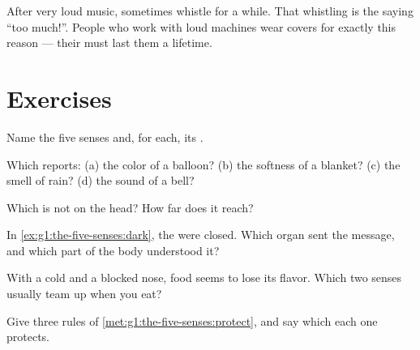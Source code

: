 \begin{example}\label{ex:g1:the-five-senses:loud}
After very loud music,  sometimes whistle for a while. That
whistling is the  saying ``too much!''. People who work with
loud machines wear  covers for exactly this reason --- their
 must last them a lifetime.
\end{example}

\section{Exercises}

\begin{exercise}[$\star$]\label{exo:g1:the-five-senses:1}
Name the five senses and, for each, its .
\end{exercise}

\begin{exercise}[$\star$]\label{exo:g1:the-five-senses:2}
Which  reports: (a) the color of a balloon? (b) the
softness of a blanket? (c) the smell of rain? (d) the sound of a
bell?
\end{exercise}

\begin{exercise}[$\star$]\label{exo:g1:the-five-senses:3}
Which  is not on the head? How far does it reach?
\end{exercise}

\begin{exercise}[$\star$]\label{exo:g1:the-five-senses:4}
In \cref{ex:g1:the-five-senses:dark}, the  were closed. Which
organ sent the message, and which part of the body understood it?
\end{exercise}

\begin{exercise}[$\star$]\label{exo:g1:the-five-senses:5}
With a cold and a blocked nose, food seems to lose its flavor.
Which two senses usually team up when you eat?
\end{exercise}

\begin{exercise}[$\star$]\label{exo:g1:the-five-senses:6}
Give three rules of \cref{met:g1:the-five-senses:protect}, and say
which  each one protects.
\end{exercise}

